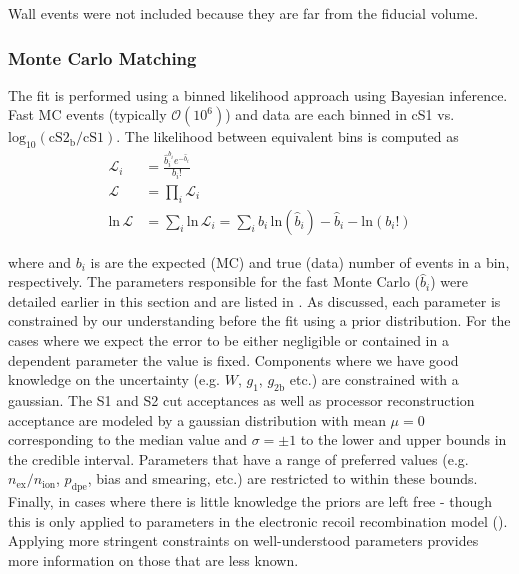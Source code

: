 Wall events were not included because they are far from the fiducial volume.



\subsubsection{Monte Carlo Matching}
\label{subsubsec:er_nr_calibrations_parameter_determ_mc_match}
The fit is performed using a binned likelihood approach using Bayesian inference.  Fast MC events (typically $\mathcal{O}(10^6)$) and
data are each binned in cS1 vs. $\mathrm{log_{10}(cS2_b / cS1)}$.  The likelihood between equivalent bins \li is computed as
\begin{subequations}
\begin{align}
\mathcal{L}_i &=\frac{\hat{b}_{i}^{b_i} e^{-\hat{b}_{i}}}{b_{i}!} \\
\mathcal{L} &= \prod_i \mathcal{L}_i \\
\mathrm{ln}\, \mathcal{L} &= \sum_i \mathrm{ln}\, \mathcal{L}_i = \sum_i b_i\, \mathrm{ln} (\hat{b}_i) - \hat{b}_i - \mathrm{ln} (b_i !)
\end{align}
\end{subequations}

\noindent where \bhi and $b_i$ is are the expected (MC) and true (data) number of events in a bin, respectively.  The parameters
responsible for the fast Monte Carlo ($\hat{b}_i$) were detailed earlier in this section and are listed in
.  As discussed, each parameter is constrained by our understanding before
the fit using a prior distribution.  For the cases where we expect the error to be either negligible or contained in a dependent parameter
the value is fixed.  Components where we have good knowledge on the uncertainty (e.g. $W$, $g_1$, $g_{2\mathrm{b}}$ etc.) are constrained
with a gaussian.  The S1 and S2 cut acceptances as well as processor reconstruction acceptance are modeled by a gaussian distribution with
mean $\mu = 0$ corresponding to the median value and $\sigma = \pm 1$ to the lower and upper bounds in the credible interval.  Parameters
that have a range of preferred values (e.g. $n_{\mathrm{ex}} / n_{\mathrm{ion}}$, $p_{\mathrm{dpe}}$,
bias and smearing, etc.) are restricted to within these bounds.  Finally, in cases where there is little knowledge the priors
are left free - though this is only applied to parameters in the electronic recoil recombination model
().  Applying more stringent constraints on well-understood parameters provides
more information on those that are less known.

